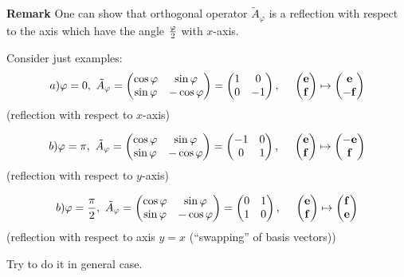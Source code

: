 \documentclass[12pt]{article}
\numberwithin{equation}{section}
\begin{document}
      \m

{\footnotesize
      {\bf Remark} One can show that orthogonal operator
       $\tilde A_\varphi$ is a reflection with respect
        to the axis which have the angle $\varphi\over 2$ with $x$-axis.

     Consider just examples:
                   $$
     a) \varphi=0, \,\, \tilde A_\varphi=
                    \begin{pmatrix}
      \cos\varphi & \sin\varphi \\
      \sin\varphi & -\cos\varphi\\
       \end{pmatrix}=\begin{pmatrix}
      1 & 0 \\
      0 & -1\\
       \end{pmatrix},\,\,
       \quad \begin{pmatrix}{\bf e}\cr {\bf f}\end{pmatrix}
       \mapsto
       \begin{pmatrix}{\bf e}\cr -{\bf f}\end{pmatrix}
     $$
     (reflection with respect to $x$-axis)

        $$
             b) \varphi=\pi, \,\, \tilde A_\varphi=
                    \begin{pmatrix}
      \cos\varphi & \sin\varphi \\
      \sin\varphi & -\cos\varphi\\
       \end{pmatrix}=\begin{pmatrix}
      -1 & 0 \\
      0 & 1\\
       \end{pmatrix},\,\,
       \quad \begin{pmatrix}{\bf e}\cr {\bf f}\end{pmatrix}
       \mapsto
       \begin{pmatrix}-{\bf e}\cr {\bf f}\end{pmatrix}
        $$
     (reflection with respect to $y$-axis)

     $$
             b) \varphi={\pi\over 2}, \,\, \tilde A_\varphi=
                    \begin{pmatrix}
      \cos\varphi & \sin\varphi \\
      \sin\varphi & -\cos\varphi\\
       \end{pmatrix}=\begin{pmatrix}
      0 & 1 \\
      1 & 0\\
       \end{pmatrix},\,\,
       \quad \begin{pmatrix}{\bf e}\cr {\bf f}\end{pmatrix}
       \mapsto
       \begin{pmatrix}{\bf f}\cr {\bf e}\end{pmatrix}
     $$
(reflection with respect to axis $y=x$ (``swapping'' of basis vectors))

Try to do it in general case.
}
\end{document}
